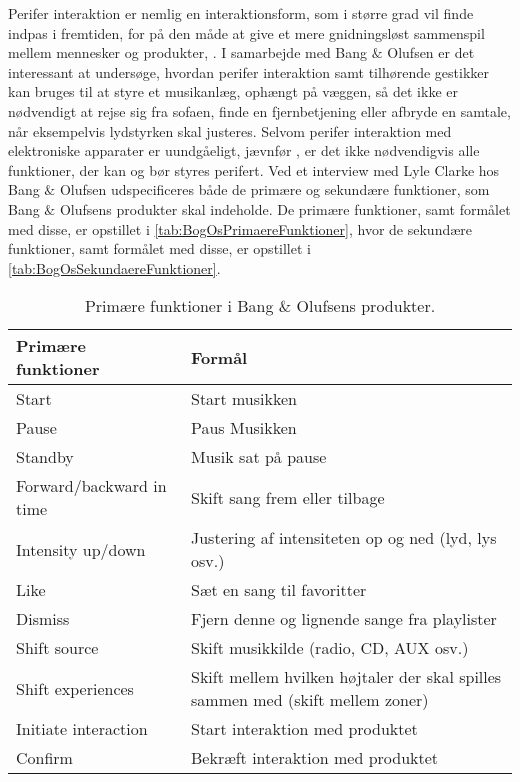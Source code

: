 Perifer interaktion er nemlig en interaktionsform, som i større grad vil finde indpas i fremtiden, for på den måde at give et mere gnidningsløst sammenspil mellem mennesker og produkter, \parencite[s. 1]{PDF:PIIntroduction}. I samarbejde med Bang $\&$ Olufsen er det interessant at undersøge, hvordan perifer interaktion samt tilhørende gestikker kan bruges til at styre et musikanlæg, ophængt på væggen, så det ikke er nødvendigt at rejse sig fra sofaen, finde en fjernbetjening eller afbryde en samtale, når eksempelvis lydstyrken skal justeres. Selvom perifer interaktion med elektroniske apparater er uundgåeligt, jævnfør \textcite[s. 1]{PDF:PIIntroduction}, er det ikke nødvendigvis alle funktioner, der kan og bør styres perifert. Ved et interview med Lyle Clarke hos Bang $\&$ Olufsen udspecificeres både de primære og sekundære funktioner, som Bang $\&$ Olufsens produkter skal indeholde. De primære funktioner, samt formålet med disse, er opstillet i \autoref{tab:BogOsPrimaereFunktioner}, hvor de sekundære funktioner, samt formålet med disse, er opstillet i \autoref{tab:BogOsSekundaereFunktioner}.
%
\begin{table}[H]
	\centering
	\begin{tabular}{ | l | p{8cm} |}
		\hline
		\multicolumn{1}{|l|}{\textbf{Primære funktioner}} & \multicolumn{1}{l|}{\textbf{Formål}} \\ \hline
		Start & Start musikken \\ \hline
		Pause & Paus Musikken \\ \hline
		Standby & Musik sat på pause \\ \hline
		Forward/backward in time & Skift sang frem eller tilbage \\ \hline
		Intensity up/down & Justering af intensiteten op og ned (lyd, lys osv.) \\ \hline
		Like & Sæt en sang til favoritter \\ \hline
		Dismiss & Fjern denne og lignende sange fra playlister \\ \hline
		Shift source & Skift musikkilde (radio, CD, AUX osv.) \\ \hline
		Shift experiences & Skift mellem hvilken højtaler der skal spilles sammen med (skift mellem zoner) \\ \hline
		Initiate interaction & Start interaktion med produktet \\ \hline
		Confirm & Bekræft interaktion med produktet \\ \hline
	\end{tabular}
	\caption{Primære funktioner i Bang $\&$ Olufsens produkter.}
	\label{tab:BogOsPrimaereFunktioner}
\end{table}
